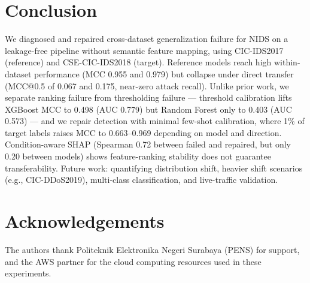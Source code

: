 \documentclass[11pt,a4paper]{article}
\begin{document}
\section{Conclusion}
We diagnosed and repaired cross-dataset generalization failure for NIDS on a leakage-free
pipeline without semantic feature mapping, using CIC-IDS2017 (reference) and CSE-CIC-IDS2018
(target). Reference models reach high within-dataset performance (MCC 0.955 and 0.979) but
collapse under direct transfer (MCC@0.5 of 0.067 and 0.175, near-zero attack recall). Unlike
prior work, we separate ranking failure from thresholding failure --- threshold calibration
lifts XGBoost MCC to 0.498 (AUC 0.779) but Random Forest only to 0.403 (AUC 0.573) --- and we
repair detection with minimal few-shot calibration, where 1\% of target labels raises MCC to
0.663--0.969 depending on model and direction. Condition-aware SHAP (Spearman 0.72 between
failed and repaired, but only 0.20 between models) shows feature-ranking stability does not
guarantee transferability. Future work: quantifying distribution shift, heavier shift
scenarios (e.g., CIC-DDoS2019), multi-class classification, and live-traffic validation.

\section*{Acknowledgements}
The authors thank Politeknik Elektronika Negeri Surabaya (PENS) for support, and the AWS
partner for the cloud computing resources used in these experiments.
\end{document}

